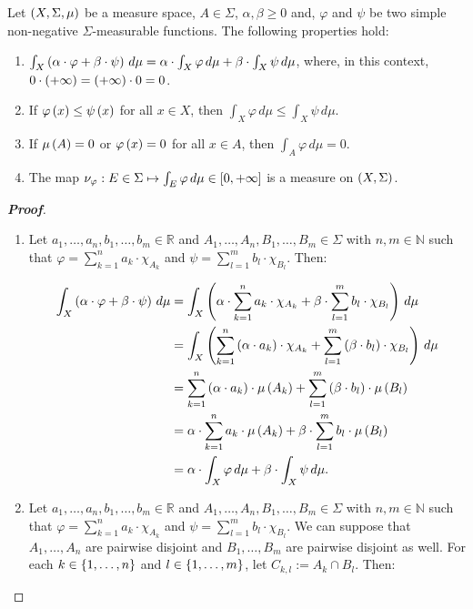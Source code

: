 \begin{proposition}
  Let $\left(X,\Sigma,\mu\right)$ be a measure space, $A\in\Sigma$, $\alpha,\beta\geq 0$ and, $\varphi$ and $\psi$ be two simple non-negative $\Sigma$-measurable functions. The following properties hold:

  \begin{enumerate}
      \item $\int_{X}{\left(\alpha\cdot\varphi+\beta\cdot\psi\right)\,d\mu}=\alpha\cdot\int_{X}{\varphi\,d\mu}+\beta\cdot\int_{X}{\psi\,d\mu}$, where, in this context, $0\cdot\left(+\infty\right)=\left(+\infty\right)\cdot 0=0$.
      \item If $\varphi\left(x\right)\leq\psi\left(x\right)$ for all $x\in X$, then $\int_{X}{\varphi\,d\mu}\leq\int_{X}{\psi\,d\mu}$.
      \item If $\mu\left(A\right)=0$ or $\varphi\left(x\right)=0$ for all $x\in A$, then $\int_{A}{\varphi\,d\mu}=0$.
      \item The map $\nu_{\varphi}:E\in\Sigma\mapsto\int_{E}{\varphi\,d\mu}\in\left[0,+\infty\right]$ is a measure on $\left(X,\Sigma\right)$.
  \end{enumerate}
  \begin{proof}[\rm\textbf{Proof}]
    \hfill
    \begin{enumerate}
      \item Let $a_1,\dots,a_n,b_1,\dots,b_m\in\mathbb{R}$ and $A_1,\dots,A_n,B_1,\dots,B_m\in\Sigma$ with $n,m\in\mathbb{N}$ such that $\varphi=\sum_{k=1}^{n}{a_k\cdot\chi_{A_k}}$ and $\psi=\sum_{l=1}^{m}{b_l\cdot\chi_{B_l}}$. Then:
      
      \begin{equation}
        \begin{split}
          \int_{X}{\left(\alpha\cdot\varphi+\beta\cdot\psi\right)\,d\mu} & =\int_{X}{\left(\alpha\cdot\sum_{k=1}^{n}{a_k\cdot\chi_{A_k}}+\beta\cdot\sum_{l=1}^{m}{b_l\cdot\chi_{B_l}}\right)\,d\mu}\\
          & =\int_{X}{\left(\sum_{k=1}^{n}{\left(\alpha\cdot a_k\right)\cdot\chi_{A_k}}+\sum_{l=1}^{m}{\left(\beta\cdot b_l\right)\cdot\chi_{B_l}}\right)\,d\mu}\\
          & =\sum_{k=1}^{n}{\left(\alpha\cdot a_k\right)\cdot\mu\left(A_k\right)}+\sum_{l=1}^{m}{\left(\beta\cdot b_l\right)\cdot\mu\left(B_l\right)}\\
          & =\alpha\cdot\sum_{k=1}^{n}{a_k\cdot\mu\left(A_k\right)}+\beta\cdot\sum_{l=1}^{m}{b_l\cdot\mu\left(B_l\right)}\\
          & =\alpha\cdot\int_{X}{\varphi\,d\mu}+\beta\cdot\int_{X}{\psi\,d\mu}.
        \end{split}
      \end{equation}
      \item Let $a_1,\dots,a_n,b_1,\dots,b_m\in\mathbb{R}$ and $A_1,\dots,A_n,B_1,\dots,B_m\in\Sigma$ with $n,m\in\mathbb{N}$ such that $\varphi=\sum_{k=1}^{n}{a_k\cdot\chi_{A_k}}$ and $\psi=\sum_{l=1}^{m}{b_l\cdot\chi_{B_l}}$. We can suppose that $A_1,\dots,A_n$ are pairwise disjoint and $B_1,\dots, B_m$ are pairwise disjoint as well. For each $k\in\left\{1,\dots,n\right\}$ and $l\in\left\{1,\dots,m\right\}$, let $C_{k,l}:=A_k\cap B_l$. Then:
      

\end{enumerate}
\end{proof}
\end{proposition}
